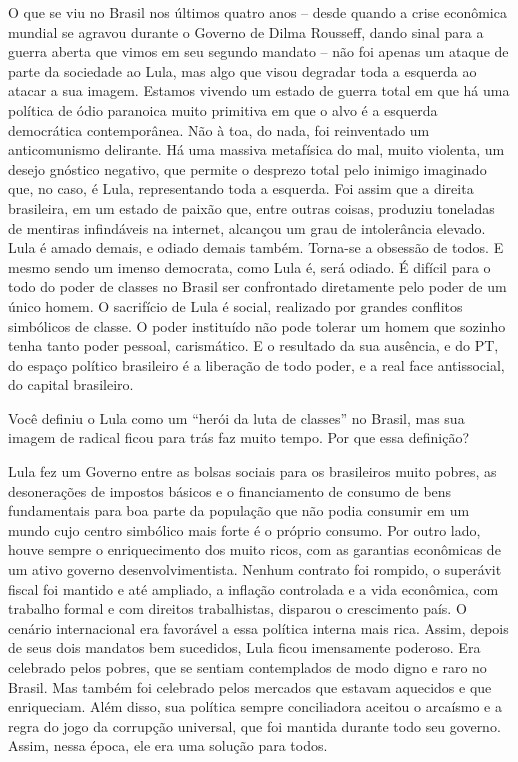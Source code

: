 O que se viu no Brasil nos últimos quatro anos -- desde quando a crise
econômica mundial se agravou durante o Governo de Dilma Rousseff, dando
sinal para a guerra aberta que vimos em seu segundo mandato -- não foi
apenas um ataque de parte da sociedade ao Lula, mas algo que visou
degradar toda a esquerda ao atacar a sua imagem. Estamos vivendo um
estado de guerra total em que há uma política de ódio paranoica muito
primitiva em que o alvo é a esquerda democrática contemporânea. Não à
toa, do nada, foi reinventado um anticomunismo delirante. Há uma massiva
metafísica do mal, muito violenta, um desejo gnóstico negativo, que
permite o desprezo total pelo inimigo imaginado que, no caso, é Lula,
representando toda a esquerda. Foi assim que a direita brasileira, em um
estado de paixão que, entre outras coisas, produziu toneladas de
mentiras infindáveis na internet, alcançou um grau de intolerância
elevado. Lula é amado demais, e odiado demais também. Torna-se a
obsessão de todos. E mesmo sendo um imenso democrata, como Lula é, será
odiado. É difícil para o todo do poder de classes no Brasil ser
confrontado diretamente pelo poder de um único homem. O sacrifício de
Lula é social, realizado por grandes conflitos simbólicos de classe. O
poder instituído não pode tolerar um homem que sozinho tenha tanto poder
pessoal, carismático. E o resultado da sua ausência, e do PT, do espaço
político brasileiro é a liberação de todo poder, e a real face
antissocial, do capital brasileiro.

Você definiu o Lula como um ``herói da luta de classes'' no Brasil, mas
sua imagem de radical ficou para trás faz muito tempo. Por que essa
definição?

Lula fez um Governo entre as bolsas sociais para os brasileiros muito
pobres, as desonerações de impostos básicos e o financiamento de consumo
de bens fundamentais para boa parte da população que não podia consumir
em um mundo cujo centro simbólico mais forte é o próprio consumo. Por
outro lado, houve sempre o enriquecimento dos muito ricos, com as
garantias econômicas de um ativo governo desenvolvimentista. Nenhum
contrato foi rompido, o superávit fiscal foi mantido e até ampliado, a
inflação controlada e a vida econômica, com trabalho formal e com
direitos trabalhistas, disparou o crescimento país. O cenário
internacional era favorável a essa política interna mais rica. Assim,
depois de seus dois mandatos bem sucedidos, Lula ficou imensamente
poderoso. Era celebrado pelos pobres, que se sentiam contemplados de
modo digno e raro no Brasil. Mas também foi celebrado pelos mercados que
estavam aquecidos e que enriqueciam. Além disso, sua política sempre
conciliadora aceitou o arcaísmo e a regra do jogo da corrupção
universal, que foi mantida durante todo seu governo. Assim, nessa época,
ele era uma solução para todos.

